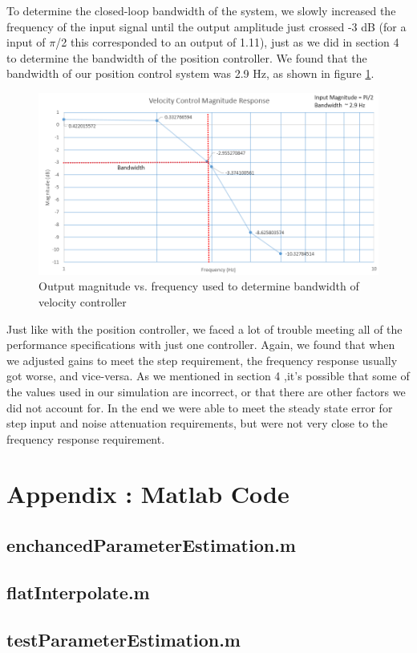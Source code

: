 \documentclass{article}
\theoremstyle{plain}
\theoremstyle{definition}
\theoremstyle{remark}
\begin{document}
To determine the closed-loop bandwidth of the system, we slowly increased the frequency of the input signal until the output amplitude just crossed -3 dB (for a input of $\pi$/2 this corresponded to an output of 1.11), just as we did in section 4 to determine the bandwidth of the position controller. We found that the bandwidth of our position control system was  2.9 Hz, as shown in figure \ref{VelBandwidth}.\\

\begin{figure}[htb]
\begin{center}
\includegraphics[width = 14cm]{VelocityControl_Magnitude.png}
\caption{Output magnitude vs. frequency used to determine bandwidth of velocity controller}
\label{VelBandwidth}
\end{center}
\end{figure}

Just like with the position controller, we faced a lot of trouble meeting all of the performance specifications with just one controller. Again, we found that when we adjusted gains to meet the step requirement, the frequency response usually got worse, and vice-versa. As we mentioned in section 4 ,it's possible that some of the values used in our simulation are incorrect, or that there are other factors we did not account for. In the end we were able to meet the steady state error for step input and noise attenuation requirements, but were not very close to the frequency response requirement.\\

\clearpage

\section*{Appendix : Matlab Code}
\subsection*{enchancedParameterEstimation.m}


\subsection*{flatInterpolate.m}


\subsection*{testParameterEstimation.m}

\end{document}
